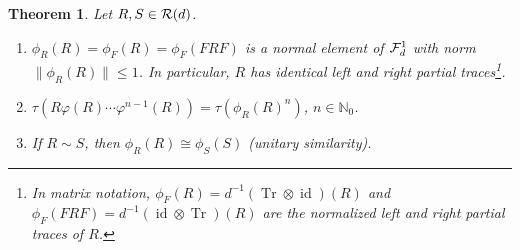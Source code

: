 \documentclass[12pt,a4paper]{amsart}
\numberwithin{equation}{section}
\newtheorem{theorem}{Theorem}[section]
\theoremstyle{remark}
\def\id{\operatorname{id}}
\def\id{\operatorname{id}}
\DeclareMathOperator{\Tr}{Tr}
\newcommand{\ot}{\otimes}
\newcommand{\Nl}{\mathbb{N}}
\begin{document}
\begin{theorem}\label{theorem:phiR}
    Let $R,S\in\mathcal{R}(d)$. 
    \begin{enumerate}
     \item\label{item:left-and-right} $\phi_R(R)=\phi_F(R)=\phi_F(FRF)$ is a normal element of $\mathcal{F}_d^1$ with norm $\|\phi_R(R)\|\leq1$. In particular, $R$ has identical left and right partial traces\footnote{In matrix notation, $\phi_F(R)=d^{-1}(\Tr\ot\id)(R)$ and $\phi_F(FRF)=d^{-1}(\id\ot\Tr)(R)$ are the normalized left and right partial traces of $R$.}.
     \item\label{item:R-cycles} $\tau(R\varphi(R)\cdots\varphi^{n-1}(R))=\tau(\phi_R(R)^n)$, $n\in\Nl_0$.
     \item\label{item:phiRR-is-an-invariant} If $R\sim S$, then $\phi_R(R)\cong\phi_S(S)$ (unitary similarity).
    \end{enumerate}
\end{theorem}
\end{document}
